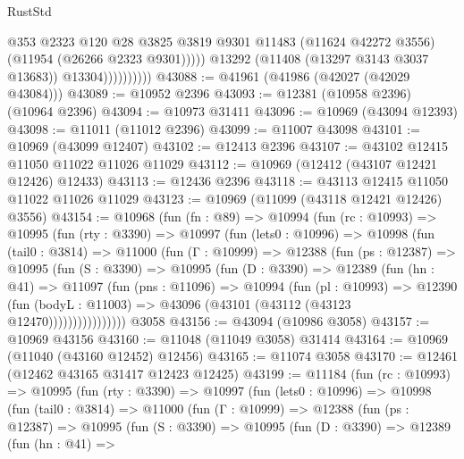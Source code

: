 \begin{lexlean}{RustStd}
\begin{coremodule}
                              @353
                              @2323
                              @120
                              @28
                              @3825
                              @3819
                              @9301
                              @11483
                              (@11624 @42272 @3556)
                              (@11954 (@26266 @2323 @9301)))))
                        @13292
                        (@11408 (@13297 @3143 @3037 @13683))
                        @13304))))))))))
@43088 := @41961 (@41986 (@42027 (@42029 @43084)))
@43089 := @10952 @2396
@43093 := @12381 (@10958 @2396) (@10964 @2396)
@43094 := @10973 @31411
@43096 := @10969 (@43094 @12393)
@43098 := @11011 (@11012 @2396)
@43099 := @11007 @43098
@43101 := @10969 (@43099 @12407)
@43102 := @12413 @2396
@43107 := @43102 @12415 @11050 @11022 @11026 @11029
@43112 := @10969 (@12412 (@43107 @12421 @12426) @12433)
@43113 := @12436 @2396
@43118 := @43113 @12415 @11050 @11022 @11026 @11029
@43123 := @10969 (@11099 (@43118 @12421 @12426) @3556)
@43154 := @10968
    (fun (fn : @89) =>
    @10994
      (fun (rc : @10993) =>
      @10995
        (fun (rty : @3390) =>
        @10997
          (fun (lets0 : @10996) =>
          @10998
            (fun (tail0 : @3814) =>
            @11000
              (fun (Γ : @10999) =>
              @12388
                (fun (ps : @12387) =>
                @10995
                  (fun (S : @3390) =>
                  @10995
                    (fun (D : @3390) =>
                    @12389
                      (fun (hn : @41) =>
                      @11097
                        (fun (pns : @11096) =>
                        @10994
                          (fun (pl : @10993) =>
                          @12390
                            (fun (bodyL : @11003) =>
                            @43096 (@43101 (@43112 (@43123 @12470))))))))))))))))
    @3058
@43156 := @43094 (@10986 @3058)
@43157 := @10969 @43156
@43160 := @11048 (@11049 @3058) @31414
@43164 := @10969 (@11040 (@43160 @12452) @12456)
@43165 := @11074 @3058
@43170 := @12461 (@12462 @43165 @31417 @12423 @12425)
@43199 := @11184
    (fun (rc : @10993) =>
    @10995
      (fun (rty : @3390) =>
      @10997
        (fun (lets0 : @10996) =>
        @10998
          (fun (tail0 : @3814) =>
          @11000
            (fun (Γ : @10999) =>
            @12388
              (fun (ps : @12387) =>
              @10995
                (fun (S : @3390) =>
                @10995
                  (fun (D : @3390) =>
                  @12389
                    (fun (hn : @41) =>

\end{coremodule}
\end{lexlean}
